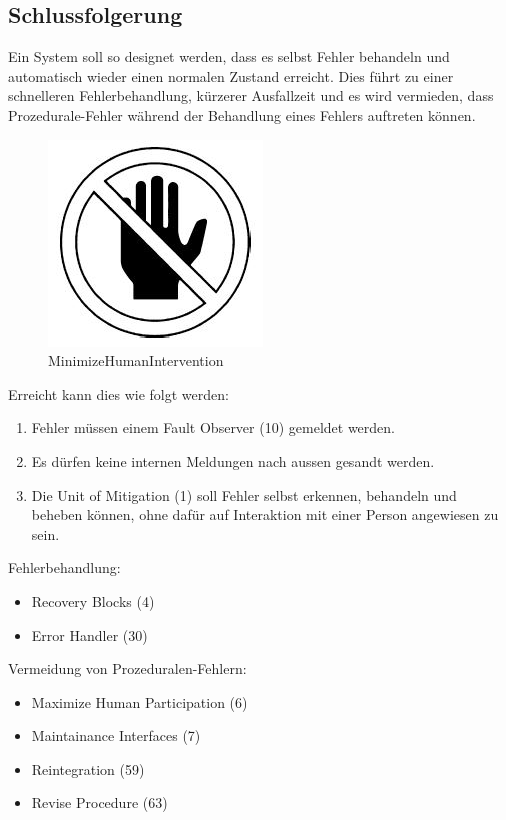 \subsection{Schlussfolgerung}

Ein System soll so designet werden, dass es selbst Fehler behandeln und automatisch wieder einen normalen Zustand erreicht. Dies führt zu einer schnelleren Fehlerbehandlung, kürzerer Ausfallzeit und es wird vermieden, dass Prozedurale-Fehler während der Behandlung eines Fehlers auftreten können.

\begin{figure}[H]
	\centering
	\includegraphics{content/faulttolerance/images/MinimizeHumanIntervention.JPG}
	\caption{MinimizeHumanIntervention}
\end{figure}


Erreicht kann dies wie folgt werden:
\begin{enumerate}
	\item Fehler müssen einem Fault Observer (10) gemeldet werden.
	\item Es dürfen keine internen Meldungen nach aussen gesandt werden.
	\item Die Unit of Mitigation (1) soll Fehler selbst erkennen, behandeln und beheben können, ohne dafür auf Interaktion mit einer Person angewiesen zu sein.
\end{enumerate}

Fehlerbehandlung:
\begin{itemize}
	\item Recovery Blocks (4)
	\item Error Handler (30)
\end{itemize}

Vermeidung von Prozeduralen-Fehlern:
\begin{itemize}
	\item Maximize Human Participation (6)
	\item Maintainance Interfaces (7)
	\item Reintegration (59)
	\item Revise Procedure (63)
\end{itemize}

